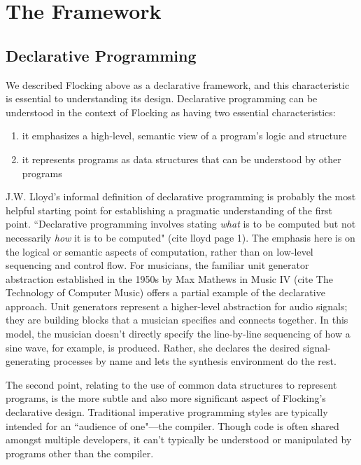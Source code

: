 \documentclass{article}
\begin{document}
\section{The Framework}

\subsection{Declarative Programming}
We described Flocking above as a declarative framework, and this characteristic is essential to understanding its design. Declarative programming can be understood in the context of Flocking as having two essential characteristics:

\begin{enumerate}
\item it emphasizes a high-level, semantic view of a program’s logic and structure
\item it represents programs as data structures that can be understood by other programs
\end{enumerate}

J.W. Lloyd's informal definition of declarative programming is probably the most helpful starting point for establishing a pragmatic understanding of the first point. ``Declarative programming involves stating {\it what} is to be computed but not necessarily {\it how} it is to be computed" (cite lloyd page 1). The emphasis here is on the logical or semantic aspects of computation, rather than on low-level sequencing and control flow. For musicians, the familiar unit generator abstraction established in the 1950s by Max Mathews in Music IV (cite The Technology of Computer Music) offers a partial example of the declarative approach. Unit generators represent a higher-level abstraction for audio signals; they are building blocks that a musician specifies and connects together. In this model, the musician doesn't directly specify the line-by-line sequencing of how a sine wave, for example, is produced. Rather, she declares the desired signal-generating processes by name and lets the synthesis environment do the rest.

The second point, relating to the use of common data structures to represent programs, is the more subtle and also more significant aspect of Flocking’s declarative design. Traditional imperative programming styles are typically intended for an ``audience of one"---the compiler. Though code is often shared amongst multiple developers, it can’t typically be understood or manipulated by programs other than the compiler.
\end{document}
